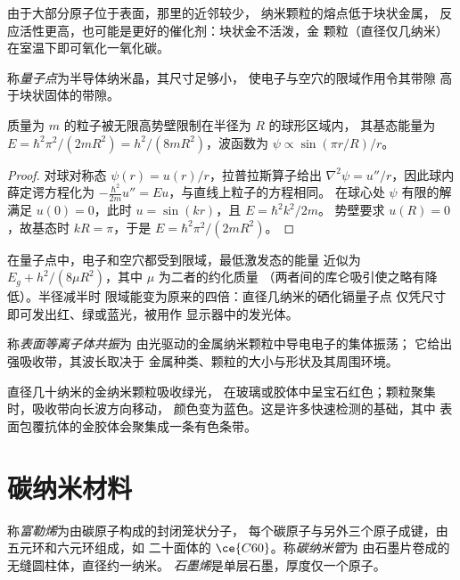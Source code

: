 由于大部分原子位于表面，那里的近邻较少，
纳米颗粒的熔点低于块状金属，
反应活性更高，也可能是更好的催化剂：块状金不活泼，金
颗粒（直径仅几纳米）在室温下即可氧化一氧化碳。

\begin{definition}[量子点]\label{def:b3:inorganic-materials:quantum-dot}
称\emph{量子点}为半导体纳米晶，其尺寸足够小，
使电子与空穴的限域作用令其带隙
高于块状固体的带隙。
\end{definition}

\begin{theorem}[球内限域]\label{thm:b3:inorganic-materials:quantum-dot}
质量为 $m$ 的粒子被无限高势壁限制在半径为 $R$ 的球形区域内，
其基态能量为 $E = \hbar^2\pi^2/(2mR^2) = h^2/(8mR^2)$，波函数为 $\psi \propto \sin(\pi r/R)/r$。
\end{theorem}

\begin{proof}
对球对称态 $\psi(r) = u(r)/r$，拉普拉斯算子给出
$\nabla^2\psi = u''/r$，因此球内薛定谔方程化为 $-\frac{\hbar^2}{2m}u'' = Eu$，与直线上粒子的方程相同。
在球心处 $\psi$ 有限的解满足 $u(0) = 0$，此时 $u = \sin(kr)$，且 $E = \hbar^2k^2/2m$。
势壁要求 $u(R) = 0$，故基态时 $kR = \pi$，于是 $E = \hbar^2\pi^2/(2mR^2)$。
\end{proof}

在量子点中，电子和空穴都受到限域，最低激发态的能量
近似为 $E_g + h^2/(8\mu R^2)$，其中 $\mu$ 为二者的约化质量
（两者间的库仑吸引使之略有降低）。半径减半时
限域能变为原来的四倍：直径几纳米的硒化镉量子点
仅凭尺寸即可发出红、绿或蓝光，被用作
显示器中的发光体。

\begin{definition}[表面等离子体共振]\label{def:b3:inorganic-materials:plasmon}
称\emph{表面等离子体共振}为
由光驱动的金属纳米颗粒中导电电子的集体振荡；
它给出强吸收带，其波长取决于
金属种类、颗粒的大小与形状及其周围环境。
\end{definition}

直径几十纳米的金纳米颗粒吸收绿光，
在玻璃或胶体中呈宝石红色；颗粒聚集时，吸收带向长波方向移动，
颜色变为蓝色。这是许多快速检测的基础，其中
表面包覆抗体的金胶体会聚集成一条有色条带。

\section{碳纳米材料}

\begin{definition}[碳纳米材料]\label{def:b3:inorganic-materials:carbon}
称\emph{富勒烯}为由碳原子构成的封闭笼状分子，
每个碳原子与另外三个原子成键，由五元环和六元环组成，如
二十面体的 $\ce{C60}$。称\emph{碳纳米管}为
由石墨片卷成的无缝圆柱体，直径约一纳米。
\emph{石墨烯}是单层石墨，厚度仅一个原子。
\end{definition}

